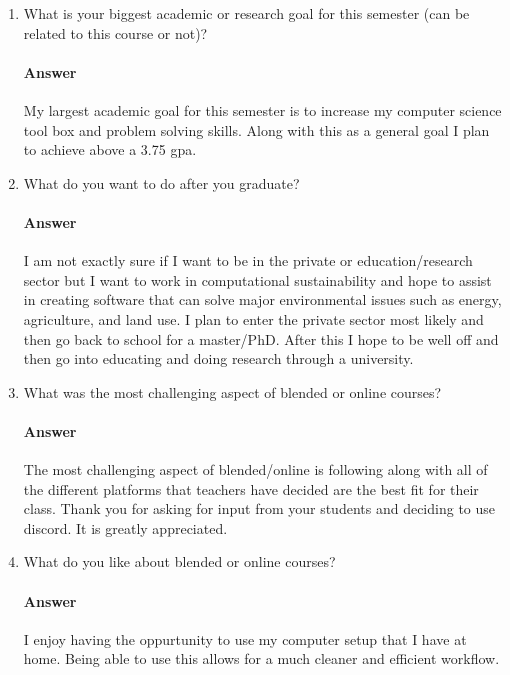 \documentclass{article}
\begin{document}
\begin{enumerate}
    \item What is your biggest academic or research goal for this semester (can
        be related to this course or not)?
        \paragraph{Answer} My largest academic goal for this semester is to increase my computer science tool box and problem solving skills. Along with this as a general goal I plan to achieve above a 3.75 gpa.

    \item What do you want to do after you graduate?
        \paragraph{Answer} I am not exactly sure if I want to be in the private or education/research sector but I want to work in computational sustainability and hope to assist in creating software that can solve major environmental issues such as energy, agriculture, and land use. I plan to enter the private sector most likely and then go back to school for a master/PhD. After this I hope to be well off and then go into educating and doing research through a university. 

    \item What was the most challenging aspect of blended or online courses?
        \paragraph{Answer} The most challenging aspect of blended/online is following along with all of the different platforms that teachers have decided are the best fit for their class. Thank you for asking for input from your students and deciding to use discord. It is greatly appreciated.

    \item What do you like about blended or online courses?
        \paragraph{Answer} I enjoy having the oppurtunity to use my computer setup that I have at home. Being able to use this allows for a much cleaner and efficient workflow.

\end{enumerate}

\end{document}
